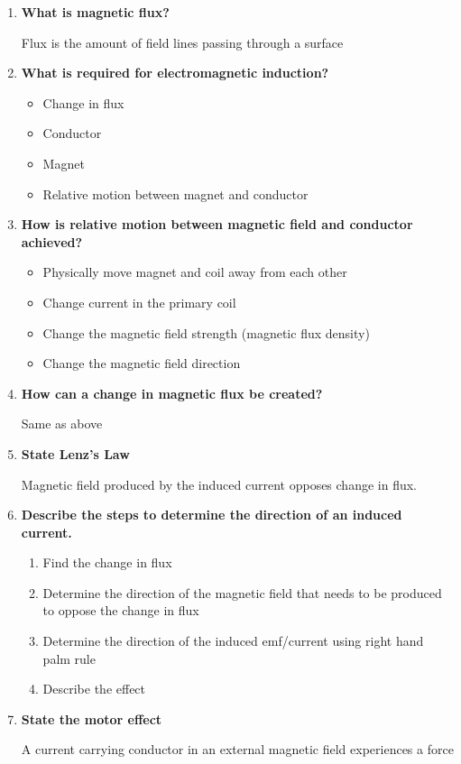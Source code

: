 	\begin{enumerate}
		\item \textbf{What is magnetic flux?}

			Flux is the amount of field lines passing through a surface

		\item \textbf{What is required for electromagnetic induction?}
		
			\begin{itemize}
				\item Change in flux
				\item Conductor
				\item Magnet
				\item Relative motion between magnet and conductor
			\end{itemize}

		\item \textbf{How is relative motion between magnetic field and conductor achieved?}
		
			\begin{itemize}
				\item Physically move magnet and coil away from each other
				\item Change current in the primary coil
				\item Change the magnetic field strength (magnetic flux density)
				\item Change the magnetic field direction
			\end{itemize}

		\item \textbf{How can a change in magnetic flux be created?}
		
			Same as above

		\item \textbf{State Lenz's Law}
		
			Magnetic field produced by the induced current opposes change in flux.

		\item \textbf{Describe the steps to determine the direction of an induced current.}
		
			\begin{enumerate}
				\item Find the change in flux
				\item Determine the direction of the magnetic field that needs to be produced to oppose the change in flux
				\item Determine the direction of the induced emf/current using right hand palm rule
				\item Describe the effect
			\end{enumerate}

		\item \textbf{State the motor effect}
		
			A current carrying conductor in an external magnetic field experiences a force
	\end{enumerate}

